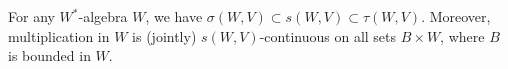 For any $W^*$-algebra $W$, we have $\sigma(W, V) \subset s(W, V) \subset \tau(W, V)$. Moreover, multiplication in $W$ is (jointly) $s(W, V)$-continuous on all sets $B \times W$, where $B$ is bounded in $W$.
